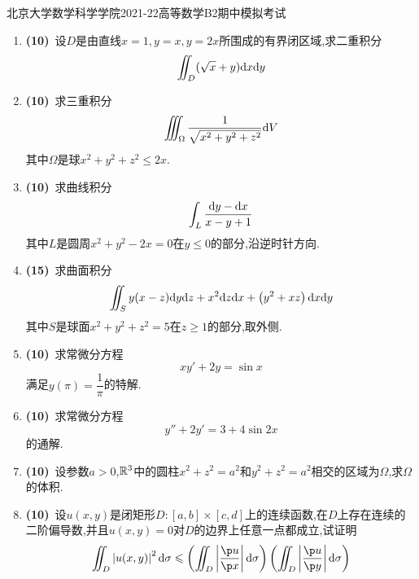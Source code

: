 \documentclass{ctexart}
\begin{document}
\pagestyle{empty}
\begin{center}\Large
    北京大学数学科学学院2021-22高等数学B2期中模拟考试
\end{center}
\begin{enumerate}[leftmargin=*,label=\textbf{\arabic*.}]
    \item \textbf{(10)}\ 设$D$是由直线$x=1,y=x,y=2x$所围成的有界闭区域,求二重积分
        \[\iint_D(\sqrt x+y)\mathrm{d} x\mathrm{d} y\]
    \item \textbf{(10)}\ 求三重积分
        \[\iiint_\Omega\dfrac{1}{\sqrt{x^2+y^2+z^2}}\mathrm{d} V\]
        其中$\Omega$是球$x^2+y^2+z^2\leqslant 2x$.
    \item \textbf{(10)}\ 求曲线积分
        \[\int_L\dfrac{\mathrm{d} y-\mathrm{d} x}{x-y+1}\]
        其中$L$是圆周$x^2+y^2-2x=0$在$y\leqslant 0$的部分,沿逆时针方向.
    \item \textbf{(15)}\ 求曲面积分
        \[\iint_Sy(x-z)\mathrm{d} y\mathrm{d} z+x^2\mathrm{d} z\mathrm{d} x+\left(y^2+xz\right)\mathrm{d} x\mathrm{d} y\]
        其中$S$是球面$x^2+y^2+z^2=5$在$z\geqslant 1$的部分,取外侧.
    \item \textbf{(10)}\ 求常微分方程
        \[xy'+2y=\sin x\]
        满足$y(\pi)=\dfrac1\pi$的特解.
    \item \textbf{(10)}\ 求常微分方程
        \[y''+2y'=3+4\sin 2x\]
        的通解.
    \item \textbf{(10)}\ 设参数$a>0$,$\mathbb{R}^3$中的圆柱$x^2+z^2=a^2$和$y^2+z^2=a^2$相交的区域为$\Omega$,求$\Omega$的体积.
    \item \textbf{(10)}\ 设$u(x,y)$是闭矩形$D:[a,b]\times[c,d]$上的连续函数,在$D$上存在连续的二阶偏导数,并且$u(x,y)=0$对$D$的边界上任意一点都成立,试证明
        \[\iint_D\left|u(x,y)\right|^2\di\sigma\leqslant\left(\iint_D\left|\dfrac{\p u}{\p x}\right|\di\sigma\right)\left(\iint_D\left|\dfrac{\p u}{\p y}\right|\di\sigma\right)\]
        

\end{enumerate}
\end{document}
